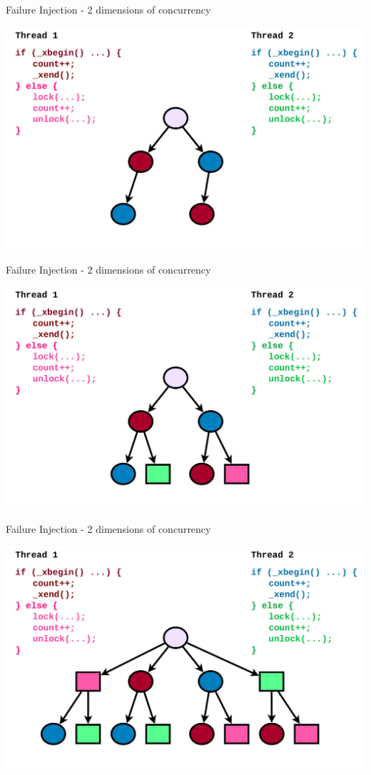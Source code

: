 \documentclass[xcolor=dvipsnames]{beamer}
\begin{document}
\begin{frame}{Failure Injection - 2 dimensions of concurrency}
	\begin{center}
		\includegraphics[width=\textwidth]{failure-injection-0.pdf}
	\end{center}
\end{frame}
\begin{frame}{Failure Injection - 2 dimensions of concurrency}
	\begin{center}
		\includegraphics[width=\textwidth]{failure-injection-1.pdf}
	\end{center}
\end{frame}
\begin{frame}{Failure Injection - 2 dimensions of concurrency}
	\begin{center}
		\includegraphics[width=\textwidth]{failure-injection-2.pdf}
	\end{center}
\end{frame}
\end{document}

